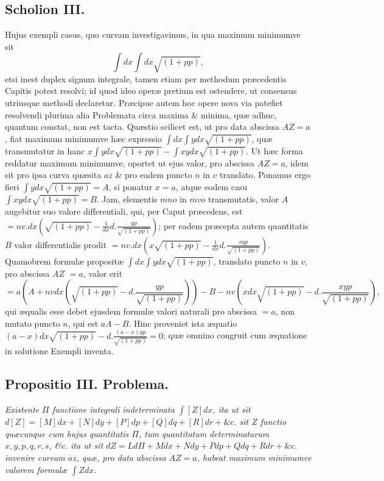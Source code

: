 \subsection*{Scholion III.}
Hujus exempli casus, quo curvam investigavimus, in qua maximum minimumve sit
\[\int dx\int dx\sqrt{(1+pp)},\]
etsi inest duplex signum integrale, tamen etiam per methodum præcedentis Capitis potest resolvi; id quod ideo operæ pretium est ostendere, ut consensus utriusque methodi declaretur. Præcipue autem hoc opere nova via patefiet resolvendi plurima alia Problemata circa maxima \& minima, quæ adhuc, quantum constat, non est tacta. Quæstio scilicet est, ut pro data abscissa $AZ=a$, fiat maximum minimumve hæc expressio $\int dx\int ydx\sqrt{(1+pp)}$, quæ transmutatur in hanc $x\int ydx\sqrt{(1+pp)}-\int xydx\sqrt{(1+pp)}$. Ut hæc forma reddatur maximum minimumve, oportet ut ejus valor, pro abscissa $AZ=a$, idem sit pro ipsa curva quæsita $az$ \& pro eadem puncto $n$ in $v$ translato. Ponamus ergo fieri $\int ydx\sqrt{(1+pp)}=A$, si ponatur $x=a$, atque eodem casu $\int xydx\sqrt{(1+pp)}=B$. Jam, elementis $mno$ in $mv o$ transmutatis, valor $A$ augebitur suo valore differentiali, qui, per Caput præcedens, est $=nv.dx\left(\sqrt{(1+pp)}-\frac1{dx}d.\frac{yp}{\sqrt{(1+pp)}}\right)$; per eadem præcepta autem quantitatis $B$ valor differentialis prodit $=nv.dx\left(x\sqrt{(1+pp)}-\frac1{dx}d.\frac{xyp}{\sqrt{(1+pp)}}\right)$. Quamobrem formulæ propositæ $\int dx\int ydx\sqrt{(1+pp)}$, translato puncto $n$ in $v$, pro abscissa $AZ$
$=a$, valor erit
\[=a\left(A+nv dx\left(\sqrt{(1+pp)}-d.\frac{yp}{\sqrt{(1+pp)}}\right)\right)-B-nv\left(xdx\sqrt{(1+pp)}-d.\frac{xyp}{\sqrt{(1+pp)}}\right),\]
qui æqualis esse debet ejusdem formulæ valori naturali pro abscissa $=a$, non mutato puncto $n$, qui est $aA-B$. Hinc proveniet ista æquatio $(a-x)dx\sqrt{(1+pp)}-d.\frac{(a-x)yp}{\sqrt{(1+pp)}}=0$; quæ omnino congruit cum æquatione in solutione Exempli inventa.
\subsection*{Propositio III. Problema.}
\textit{Existente $\Pi$ functione integrali indeterminata $\int[Z]dx$, ita ut sit $d[Z]=[M]dx+[N]dy+[P]dp+[Q]dq+[R]dr+\text{\&c.}$ sit $Z$ functio quæcunque cum hujus quantitatis $\Pi$, tum quantitatum determinatarum $x,y,p,q,r,s$, \&c. ita ut sit $dZ=Ld\Pi+Mdx+Ndy+Pdp+Qdq+Rdr+\text{\&c.}$ invenire curvam $az$, quæ, pro data abscissa $AZ=a$, habeat maximum minimumve valorem formulæ $\int Zdx$.}
